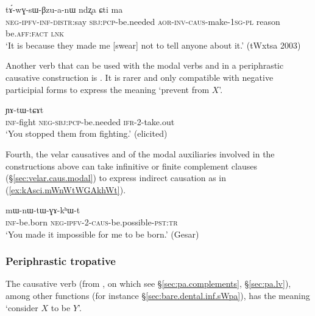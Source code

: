  \begin{exe}
\ex  \label{ex:kWra.tAwGsWBzuanW}
\gll [mɯ-tu-kɤ-nɤtɯti kɯ-ra] tɤ́-wɣ-sɯ-βzu-a-nɯ ndʐa ɕti ma  \\
\textsc{neg}-\textsc{ipfv}-\textsc{inf}-\textsc{distr}:say \textsc{sbj}:\textsc{pcp}-be.needed \textsc{aor}-\textsc{inv}-\textsc{caus}-make-\textsc{1sg}-\textsc{pl} reason be.\textsc{aff}:\textsc{fact} \textsc{lnk} \\ 
\glt `It is because they made me [swear] not to tell anyone about it.'  (tWxtsa 2003)
\end{exe}

Another verb that can be used with the modal verbs  and  in a periphrastic causative construction is . It is rarer and only compatible with negative participial forms to express the meaning `prevent from $X$'.

\begin{exe}
\ex  \label{ex:mAkWra.YAtWtCAt}
\gll  [kɤ-ɤlɯlɤt mɤ-kɯ-ra] ɲɤ-tɯ-tɕɤt \\
\textsc{inf}-fight \textsc{neg}-\textsc{sbj}:\textsc{pcp}-be.needed \textsc{ifr}-2-take.out \\
\glt `You stopped them from fighting.' (elicited)
\end{exe}
 
 Fourth, the velar causatives   and   of the modal auxiliaries involved in the constructions above can take infinitive or finite complement clauses (§\ref{sec:velar.caus.modal}) to express indirect causation as in (\ref{ex:kAsci.mWnWtWGAkhWt}).

\begin{exe}
\ex \label{ex:kAsci.mWnWtWGAkhWt}
\gll   [kɤ-sci] mɯ-nɯ-tɯ-ɣɤ-kʰɯ-t  \\
\textsc{inf}-be.born \textsc{neg}-\textsc{ipfv}-2-\textsc{caus}-be.possible-\textsc{pst}:\textsc{tr} \\
\glt `You made it impossible for me to be born.' (Gesar)
\end{exe}  

\subsubsection{Periphrastic tropative} \label{sec:tropative.sWpa}
The causative verb  (from , on which see
§\ref{sec:pa.complements}, §\ref{sec:pa.lv}), among other functions (for instance §\ref{sec:bare.dental.inf.sWpa}), has the meaning `consider $X$ to be $Y$'.

